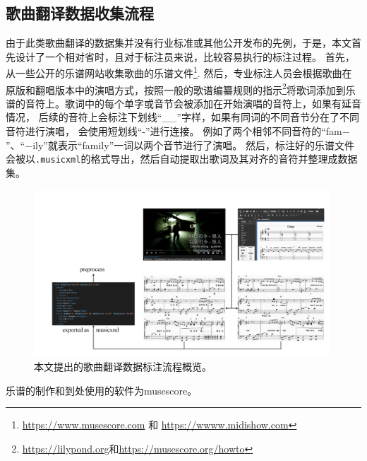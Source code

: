 \subsection{歌曲翻译数据收集流程}
由于此类歌曲翻译的数据集并没有行业标准或其他公开发布的先例，于是，本文首先设计了一个相对省时，且对于标注员来说，比较容易执行的标注过程。
首先，从一些公开的乐谱网站收集歌曲的乐谱文件\footnote{\url{https://www.musescore.com} 和 \url{https://wwww.midishow.com}}.
然后，专业标注人员会根据歌曲在原版和翻唱版本中的演唱方式，按照一般的歌谱编纂规则的指示\footnote{\url{https://lilypond.org}和\url{https://musescore.org/howto}}将歌词添加到乐谱的音符上。歌词中的每个单字或音节会被添加在开始演唱的音符上，如果有延音情况，
后续的音符上会标注下划线``\_\_''字样，如果有同词的不同音节分在了不同音符进行演唱，
会使用短划线``-''进行连接。
例如了两个相邻不同音符的``fam$-$''、``$-$ily''就表示``family''一词以两个音节进行了演唱。
然后，标注好的乐谱文件会被以\texttt{.musicxml}的格式导出，然后自动提取出歌词及其对齐的音符并整理成数据集。
\begin{figure}[t]
    \centering
    \includegraphics[width=0.99\textwidth]{figure/ast/da_pipeline}
    \caption{本文提出的歌曲翻译数据标注流程概览。}
    \label{fig:da_pipeline}
\end{figure}
乐谱的制作和到处使用的软件为musescore。

